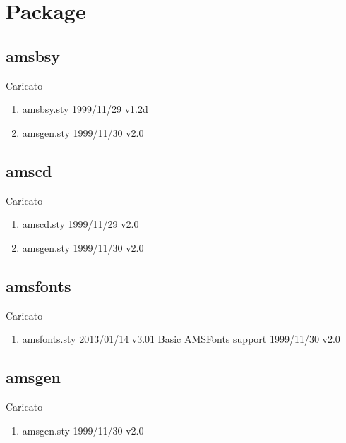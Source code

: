 \chapter{Package}
\lstset{language=[LaTeX]TeX} 
\section{amsbsy}

Caricato 
\begin{enumerate}
\item amsbsy.sty 1999/11/29 v1.2d
\item amsgen.sty 1999/11/30 v2.0
\end{enumerate}
\section{amscd}

Caricato 
\begin{enumerate}
\item amscd.sty 1999/11/29 v2.0
\item amsgen.sty 1999/11/30 v2.0
\end{enumerate}
\section{amsfonts}

Caricato 
\begin{enumerate}
\item amsfonts.sty 2013/01/14 v3.01 Basic AMSFonts support 1999/11/30 v2.0
\end{enumerate}
\section{amsgen}

Caricato 
\begin{enumerate}
\item amsgen.sty 1999/11/30 v2.0
\end{enumerate}
